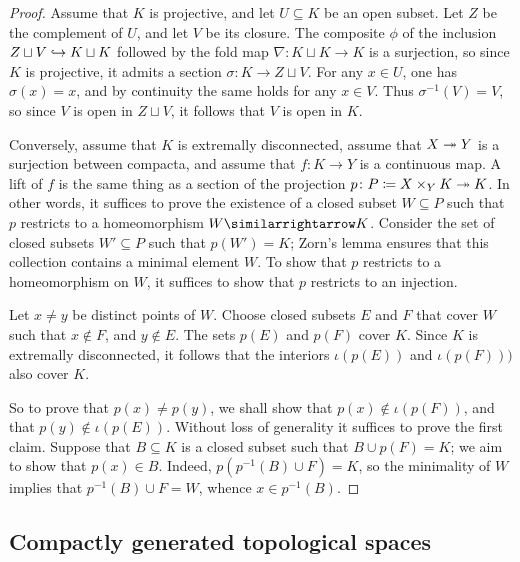\begin{proof}
	Assume that $ K $ is projective, and let $ U \subseteq K $ be an open subset.
	Let $ Z $ be the complement of $ U $, and let $ V $ be its closure.
	The composite $ \phi $ of the inclusion $ Z \sqcup V \hookrightarrow K \sqcup K $ followed by the fold map $ \nabla \colon K \sqcup K \to K $ is a surjection, so since $ K $ is projective, it admits a section $ \sigma \colon K \to Z \sqcup V $.
	For any $ x \in U $, one has $ \sigma(x) = x $, and by continuity the same holds for any $ x \in V $.
	Thus $ \sigma^{-1}(V) = V $, so since $ V $ is open in $ Z \sqcup V $, it follows that $ V $ is open in $ K $.

	Conversely, assume that $ K $ is extremally disconnected, assume that $ X \twoheadrightarrow Y $ is a surjection between compacta, and assume that $ f \colon K \to Y $ is a continuous map.
	A lift of $ f $ is the same thing as a section of the projection $ p \colon P \coloneq X \times_Y K \twoheadrightarrow K $.
	In other words, it suffices to prove the existence of a closed subset $ W \subseteq P $ such that $ p $ restricts to a homeomorphism $ W \equivalence K $.
	Consider the set of closed subsets $ W' \subseteq P $ such that $ p(W') = K $;
	Zorn's lemma ensures that this collection contains a minimal element $ W $.
	To show that $ p $ restricts to a homeomorphism on $ W $, it suffices to show that $ p $ restricts to an injection.

	Let $ x \neq y $ be distinct points of $ W $.
	Choose closed subsets $ E $ and $ F $ that cover $ W $ such that $ x \notin F $, and $ y \notin E $.
	The sets $ p(E) $ and $ p(F) $ cover $ K $.
	Since $ K $ is extremally disconnected, it follows that the interiors $ \iota(p(E)) $ and $ \iota(p(F))) $ also cover $ K $.

	So to prove that $ p(x) \neq p(y) $, we shall show that $ p(x) \notin \iota(p(F)) $, and that $ p(y) \notin \iota(p(E)) $.
	Without loss of generality it suffices to prove the first claim.
	Suppose that $ B \subseteq K $ is a closed subset such that $ B \cup p(F) = K $;
	we aim to show that $ p(x) \in B $.
	Indeed, $ p(p^{-1}(B) \cup F) = K $, so the minimality of $ W $ implies that $ p^{-1}(B) \cup F = W $, whence $ x \in p^{-1}(B) $.
\end{proof}
	

\subsection{Compactly generated topological spaces}

